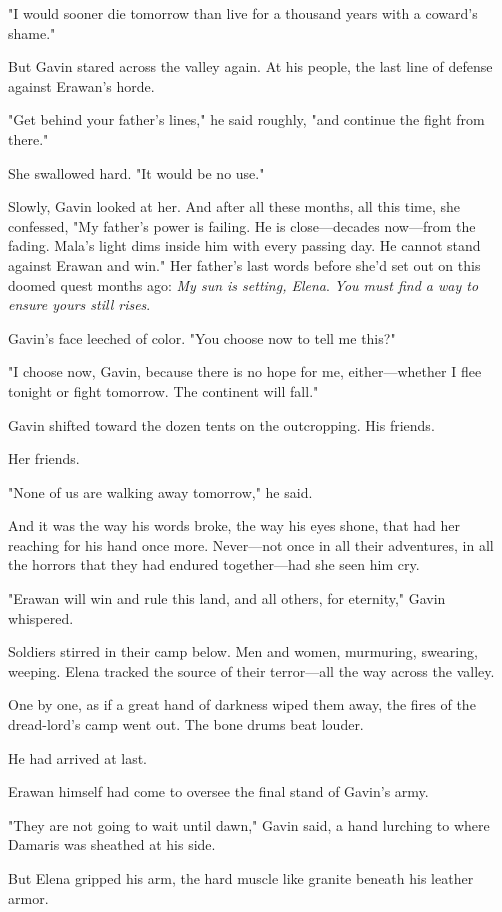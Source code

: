 "I would sooner die tomorrow than live for a thousand years with a coward's shame."

But Gavin stared across the valley again.
At his people, the last line of defense against Erawan's horde.

"Get behind your father's lines," he said roughly, "and continue the fight from there."

She swallowed hard.
"It would be no use."

Slowly, Gavin looked at her.
And after all these months, all this time, she confessed, "My father's power is failing.
He is close---decades now---from the fading.
Mala's light dims inside him with every passing day.
He cannot stand against Erawan and win."
Her father's last words before she'd set out on this doomed quest months ago: \emph{My sun is setting, Elena}.
\emph{You must find a way to ensure yours still rises}.

Gavin's face leeched of color.
"You choose now to tell me this?"

"I choose now, Gavin, because there is no hope for me, either---whether I flee tonight or fight tomorrow.
The continent will fall."

Gavin shifted toward the dozen tents on the outcropping.
His friends.

Her friends.

"None of us are walking away tomorrow," he said.

And it was the way his words broke, the way his eyes shone, that had her reaching for his hand once more.
Never---not once in all their adventures, in all the horrors that they had endured together---had she seen him cry.

"Erawan will win and rule this land, and all others, for eternity," Gavin whispered.

Soldiers stirred in their camp below.
Men and women, murmuring, swearing, weeping.
Elena tracked the source of their terror---all the way across the valley.

One by one, as if a great hand of darkness wiped them away, the fires of the dread-lord's camp went out.
The bone drums beat louder.

He had arrived at last.

Erawan himself had come to oversee the final stand of Gavin's army.

"They are not going to wait until dawn," Gavin said, a hand lurching to where Damaris was sheathed at his side.

But Elena gripped his arm, the hard muscle like granite beneath his leather armor.

